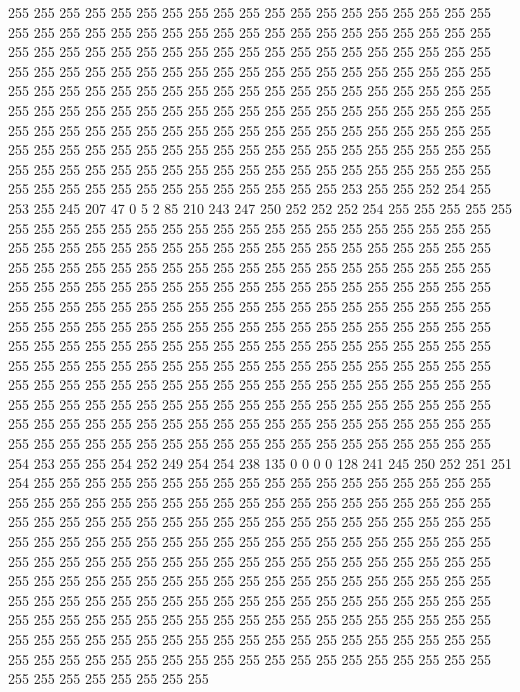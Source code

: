 255 255 255 255 255 255 255 255 255 255 255 255 255 255 255 255 255 255 255 255
255 255 255 255 255 255 255 255 255 255 255 255 255 255 255 255 255 255 255 255
255 255 255 255 255 255 255 255 255 255 255 255 255 255 255 255 255 255 255 255
255 255 255 255 255 255 255 255 255 255 255 255 255 255 255 255 255 255 255 255
255 255 255 255 255 255 255 255 255 255 255 255 255 255 255 255 255 255 255 255
255 255 255 255 255 255 255 255 255 255 255 255 255 255 255 255 255 255 255 255
255 255 255 255 255 255 255 255 255 255 255 255 255 255 255 255 255 255 255 255
255 255 255 255 255 255 255 255 255 255 255 255 255 255 255 255 255 255 255 255
255 255 255 255 255 255 255 255 255 255 255 255 255 255 255 255 255 255 255 255
255 255 255 255 253 255 255 252 254 255 253 255 245 207 47 0 5 2 85 210
243 247 250 252 252 252 254 255 255 255 255 255 255 255 255 255 255 255 255 255
255 255 255 255 255 255 255 255 255 255 255 255 255 255 255 255 255 255 255 255
255 255 255 255 255 255 255 255 255 255 255 255 255 255 255 255 255 255 255 255
255 255 255 255 255 255 255 255 255 255 255 255 255 255 255 255 255 255 255 255
255 255 255 255 255 255 255 255 255 255 255 255 255 255 255 255 255 255 255 255
255 255 255 255 255 255 255 255 255 255 255 255 255 255 255 255 255 255 255 255
255 255 255 255 255 255 255 255 255 255 255 255 255 255 255 255 255 255 255 255
255 255 255 255 255 255 255 255 255 255 255 255 255 255 255 255 255 255 255 255
255 255 255 255 255 255 255 255 255 255 255 255 255 255 255 255 255 255 255 255
255 255 255 255 255 255 255 255 255 255 255 255 255 255 255 255 255 255 255 255
255 255 255 255 255 255 255 255 255 255 255 255 255 255 255 255 255 255 255 255
255 255 255 255 255 255 255 255 255 255 255 255 255 255 255 255 255 255 255 255
254 253 255 255 254 252 249 254 254 238 135 0 0 0 0 128 241 245 250 252
251 251 254 255 255 255 255 255 255 255 255 255 255 255 255 255 255 255 255 255
255 255 255 255 255 255 255 255 255 255 255 255 255 255 255 255 255 255 255 255
255 255 255 255 255 255 255 255 255 255 255 255 255 255 255 255 255 255 255 255
255 255 255 255 255 255 255 255 255 255 255 255 255 255 255 255 255 255 255 255
255 255 255 255 255 255 255 255 255 255 255 255 255 255 255 255 255 255 255 255
255 255 255 255 255 255 255 255 255 255 255 255 255 255 255 255 255 255 255 255
255 255 255 255 255 255 255 255 255 255 255 255 255 255 255 255 255 255 255 255
255 255 255 255 255 255 255 255 255 255 255 255 255 255 255 255 255 255 255 255
255 255 255 255 255 255 255 255 255 255 255 255 255 255 255 255 255 255 255 255
255 255 255 255 255 255 255 255 255 255 255 255 255 255 255 255 255 255 255 255
